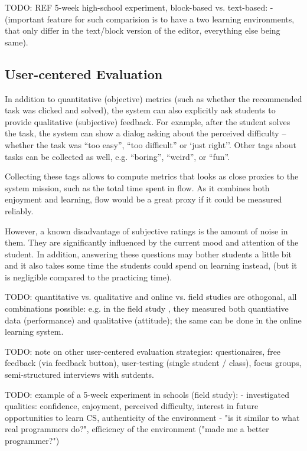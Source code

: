 TODO: REF 5-week high-school experiment, block-based vs. text-based:
- \cite{comparing-blocks-text-weintrop2017}
(important feature for such comparision is to have a two learning environments,
that only differ in the text/block version of the editor, everything else being same).


\subsection{User-centered Evaluation}

In addition to quantitative (objective) metrics (such as whether the
recommended task was clicked and solved), the system can also explicitly ask
students to provide qualitative (subjective) feedback.
For example, after the student solves the task, the system can show a dialog
asking about the perceived difficulty -- whether the task was ``too
easy'', ``too difficult'' or `just right''.
Other tags about tasks can be collected as well, e.g. ``boring'', ``weird'', or ``fun''.

Collecting these tags allows to compute metrics that looks as close proxies to
the system mission, such as the total time spent in flow.
As it combines both enjoyment and learning,
flow would be a great proxy if it could be measured reliably.

However, a known disadvantage of subjective ratings is the amount of noise
in them. They are significantly influenced by the current mood and attention of
the student.
In addition, answering these questions may bother students a little bit
and it also takes some time the students could spend on learning instead,
(but it is negligible compared to the practicing time).

TODO: quantitative vs. qualitative and online vs. field studies are othogonal,
all combinations possible: e.g. in the field study \cite{comparing-blocks-text-weintrop2017},
they measured both quantiative data (performance) and qualitative (attitude);
the same can be done in the online learning system.

TODO: note on other user-centered evaluation strategies:
questionaires, free feedback (via feedback button), user-testing (single student / class), focus groups, semi-structured interviews with sutdents.

TODO: example of a 5-week experiment in schools (field study):
\cite{comparing-blocks-text-weintrop2017}
- investigated qualities: confidence, enjoyment, perceived difficulty, interest in future opportunities to learn CS, authenticity of the environment - "is it similar to what real programmers do?", efficiency of the environment ("made me a better programmer?")

